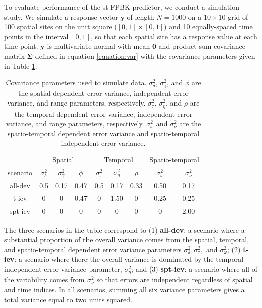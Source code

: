 \documentclass[]{interact}
\theoremstyle{plain}%
\theoremstyle{definition}
\theoremstyle{remark}
\begin{document}
To evaluate performance of the st-FPBK predictor, we conduct a
simulation study. We simulate a response vector \(\mathbf{y}\) of length
\(N = 1000\) on a \(10 \times 10\) grid of 100 spatial sites on the unit
square (\([0, 1] \times [0, 1]\)) and 10 equally-spaced time points in
the interval \([0, 1]\), so that each spatial site has a response value
at each time point. \(\mathbf{y}\) is multivariate normal with mean
\(\mathbf{0}\) and product-sum covariance matrix \(\bm{\Sigma}\) defined
in equation \ref{equation:var} with the covariance parameters given in
Table \ref{tab:simparmtab}.

\begin{table}[H]

\caption{\label{tab:simparmtab}Covariance parameters used to simulate data. $\sigma^2_{\delta}$, $\sigma^2_{\gamma}$, and $\phi$ are the spatial dependent error variance, independent error variance, and range parameters, respectively. $\sigma^2_{\tau}$, $\sigma^2_{\eta}$, and $\rho$ are the temporal dependent error variance, independent error variance, and range parameters, respectively. $\sigma^2_{\omega}$ and $\sigma^2_{\nu}$ are the spatio-temporal dependent error variance and spatio-temporal independent error variance.}
\centering
\begin{tabular}[t]{ccccccccc}
\toprule
\multicolumn{1}{c}{ } & \multicolumn{3}{c}{Spatial} & \multicolumn{3}{c}{Temporal} & \multicolumn{2}{c}{Spatio-temporal} \\
\cmidrule(l{3pt}r{3pt}){2-4} \cmidrule(l{3pt}r{3pt}){5-7} \cmidrule(l{3pt}r{3pt}){8-9}
scenario & $\sigma^2_{\delta}$ & $\sigma^2_{\gamma}$ & $\phi$ & $\sigma^2_{\tau}$ & $\sigma^2_{\eta}$ & $\rho$ & $\sigma^2_{\omega}$ & $\sigma^2_{\nu}$\\
\midrule
all-dev & 0.5 & 0.17 & 0.47 & 0.5 & 0.17 & 0.33 & 0.50 & 0.17\\
t-iev & 0 & 0 & 0.47 & 0 & 1.50 & 0 & 0.25 & 0.25\\
spt-iev & 0 & 0 & 0 & 0 & 0 & 0 & 0 & 2.00\\
\bottomrule
\end{tabular}
\end{table}

The three scenarios in the table correspond to (1) \textbf{all-dev}: a
scenario where a substantial proportion of the overall variance comes
from the spatial, temporal, and spatio-temporal dependent error variance
parameters \(\sigma^2_{\delta}, \sigma^2_{\tau},\) and
\(\sigma^2_{\omega}\); (2) \textbf{t-iev}: a scenario where there the
overall variance is dominated by the temporal independent error variance
parameter, \(\sigma^2_{\eta}\); and (3) \textbf{spt-iev}: a scenario
where all of the variability comes from \(\sigma^2_{\nu}\) so that
errors are independent regardless of spatial and time indices. In all
scenarios, summing all six variance parameters gives a total variance
equal to two units squared.
\end{document}
